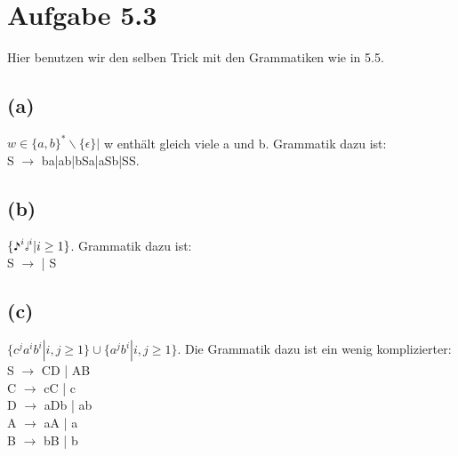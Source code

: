 \documentclass{article}
\begin{document}
\section*{Aufgabe 5.3}
Hier benutzen wir den selben Trick mit den Grammatiken wie in 5.5.
\subsection*{(a)}
$w\in\{a,b\}^* \backslash \{\epsilon\} |$ w enthält gleich viele a und b. Grammatik dazu ist:\\ S $\rightarrow$ ba|ab|bSa|aSb|SS.
\begin{center}
\end{center}

\subsection*{(b)}
$\{\eighthnote^i\halfnote^i|i\geq1\}$. Grammatik dazu ist: \\
S $\rightarrow$ \eighthnote\halfnote\halfnote | \eighthnote S\halfnote\halfnote
\begin{center}
\end{center}

\subsection*{(c)}
$\{c^ja^ib^i | i,j \geq1\} \cup \{a^jb^i|i,j \geq1 \}$. Die Grammatik dazu ist ein wenig komplizierter: \\
S $\rightarrow$ CD | AB\\
C $\rightarrow$ cC | c\\
D $\rightarrow$ aDb | ab\\
A $\rightarrow$ aA | a\\
B $\rightarrow$ bB | b
\end{document}
